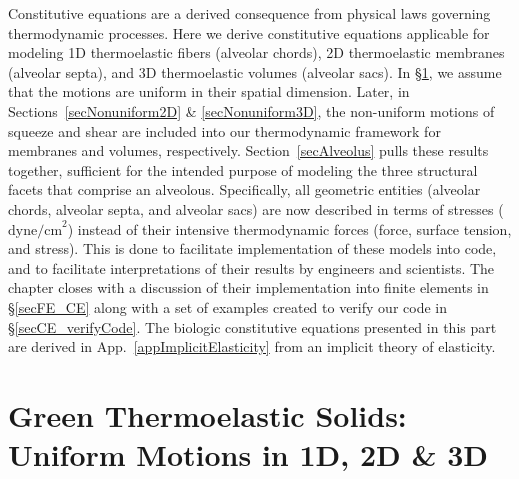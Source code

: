 Constitutive equations are a derived consequence from physical laws governing thermo\-dynamic processes.  Here we derive constitutive equations applicable for modeling 1D thermo\-elastic fibers (alveolar chords), 2D thermo\-elastic membranes (alveolar septa), and 3D thermo\-elastic volumes (alveolar sacs).  In \S\ref{secUniformCE}, we assume that the motions are uniform in their spatial dimension.  Later, in Sections~\ref{secNonuniform2D} \& \ref{secNonuniform3D}, the non-uniform motions of squeeze and shear are included into our thermo\-dynamic framework for membranes and volumes, respectively.  Section~\ref{secAlveolus} pulls these results together, sufficient for the intended purpose of modeling the three structural facets that comprise an alveolous.  Specifically, all geometric entities (alveolar chords, alveolar septa, and alveolar sacs) are now described in terms of stresses ($\text{dyne/cm}^2$) instead of their intensive thermo\-dynamic forces (force, surface tension, and stress).  This is done to facilitate implementation of these models into code, and to facilitate interpretations of their results by engineers and scientists.  The chapter closes with a discussion of their implementation into finite elements in \S\ref{secFE_CE} along with a set of examples created to verify our code in \S\ref{secCE_verifyCode}.  The biologic constitutive equations presented in this part are derived in App.~\ref{appImplicitElasticity} from an implicit theory of elasticity.

\section{Green Thermoelastic Solids: Uniform Motions in 1D, 2D \& 3D}
\label{secUniformCE}

